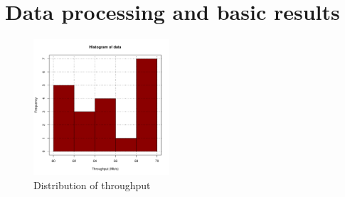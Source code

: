 \section{Data processing and basic results}
\label{section:results}

\begin{figure}[!hbt]\centering
  \includegraphics[width=0.45\textwidth]{graphics/throughput.pdf}
  \caption{Distribution of throughput}
  \label{fig:frame_sizes}
\end{figure}
